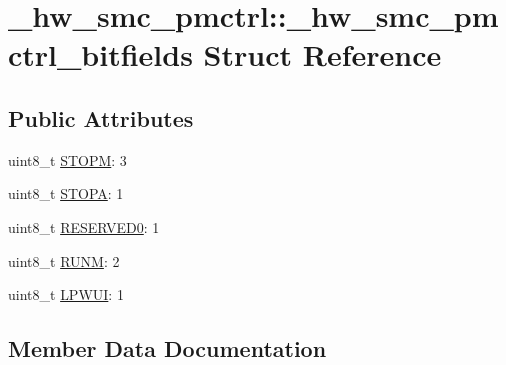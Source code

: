 \hypertarget{struct__hw__smc__pmctrl_1_1__hw__smc__pmctrl__bitfields}{}\section{\+\_\+hw\+\_\+smc\+\_\+pmctrl\+:\+:\+\_\+hw\+\_\+smc\+\_\+pmctrl\+\_\+bitfields Struct Reference}
\label{struct__hw__smc__pmctrl_1_1__hw__smc__pmctrl__bitfields}
\subsection*{Public Attributes}
\begin{DoxyCompactItemize}
\item 
uint8\+\_\+t \hyperlink{struct__hw__smc__pmctrl_1_1__hw__smc__pmctrl__bitfields_a32cb42c3b1bd5789e1281d546c90c8aa}{S\+T\+O\+PM}\+: 3
\item 
uint8\+\_\+t \hyperlink{struct__hw__smc__pmctrl_1_1__hw__smc__pmctrl__bitfields_acb42326897bfb7a398f4b2c2ff43565d}{S\+T\+O\+PA}\+: 1
\item 
uint8\+\_\+t \hyperlink{struct__hw__smc__pmctrl_1_1__hw__smc__pmctrl__bitfields_ae932734796bb3eb4d290b3a4702ea982}{R\+E\+S\+E\+R\+V\+E\+D0}\+: 1
\item 
uint8\+\_\+t \hyperlink{struct__hw__smc__pmctrl_1_1__hw__smc__pmctrl__bitfields_a417dcf159a1d5925c584e941b936ce78}{R\+U\+NM}\+: 2
\item 
uint8\+\_\+t \hyperlink{struct__hw__smc__pmctrl_1_1__hw__smc__pmctrl__bitfields_a0ea256db470e3f2230ed809edcd4e178}{L\+P\+W\+UI}\+: 1
\end{DoxyCompactItemize}


\subsection{Member Data Documentation}
